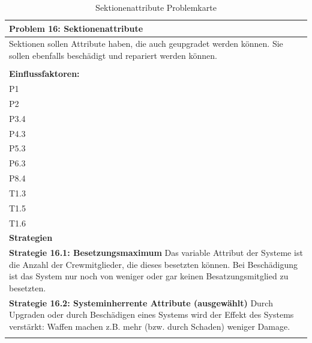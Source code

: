 \documentclass[fontsize=12pt,paper=a4,twoside]{scrartcl}
\begin{document}
\begin{table}[H]
    \centering
    \begin{tabular}{|p{15cm}|}
    \hline
          \textbf{Problem 16: Sektionenattribute}  \\ \hline
	Sektionen sollen Attribute haben, die auch geupgradet werden können. Sie sollen ebenfalls beschädigt und repariert werden können. \\
         \\ \hline
          \textbf{Einflussfaktoren: } \\
	P1 \\
	P2 \\
	P3.4 \\
	P4.3 \\
	P5.3 \\
	P6.3 \\
	P8.4 \\
	T1.3 \\
	T1.5 \\
	T1.6 \\
          \hline
          \textbf{Strategien} \\ \hline
            {}          
           \label{strategie:16.1}     
          \textbf{Strategie 16.1: Besetzungsmaximum} Das variable Attribut der Systeme ist die Anzahl der Crewmitglieder, die dieses besetzten können. Bei Beschädigung ist das System nur noch von weniger oder gar keinen Besatzungsmitglied zu besetzten.  \\        
  {}          
           \label{strategie:16.2}              
          \textbf{Strategie 16.2: Systeminherrente Attribute (ausgewählt)} Durch Upgraden oder durch Beschädigen eines Systems wird der Effekt des Systems verstärkt: Waffen machen z.B. mehr (bzw. durch Schaden) weniger Damage.  \\
	 \\ \hline
    \end{tabular}

    \caption{Sektionenattribute Problemkarte}
    \label{tab:ProblemKarte16}
\end{table}
\end{document}
